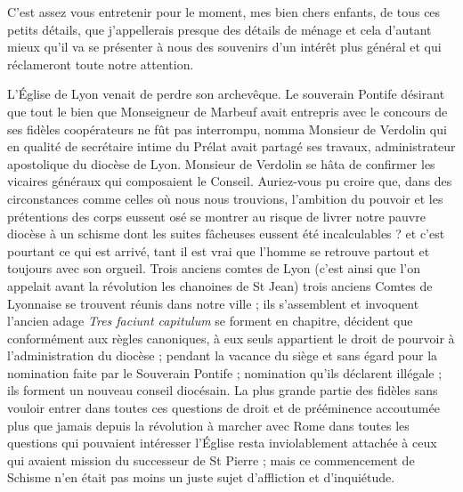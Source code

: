 \documentclass[11pt,a4paper]{report}
\begin{document}
C'est assez vous entretenir pour le moment, mes bien chers enfants, de tous ces petits détails, que j'appellerais presque des détails de ménage et cela d'autant mieux qu'il va se présenter à nous des souvenirs d'un intérêt plus général et qui réclameront toute notre attention.

L'Église de Lyon venait de perdre son archevêque. Le souverain Pontife désirant que tout le bien que Monseigneur de Marbeuf avait entrepris avec le concours de ses fidèles coopérateurs ne fût pas interrompu, nomma Monsieur de Verdolin qui en qualité de secrétaire intime du Prélat avait partagé ses travaux, administrateur apostolique du diocèse de Lyon. Monsieur de Verdolin se hâta de confirmer les vicaires généraux qui composaient le Conseil. Auriez-vous pu croire que, dans des circonstances comme celles où nous nous trouvions, l'ambition du pouvoir et les prétentions des corps eussent osé se montrer au risque de livrer notre pauvre diocèse à un schisme dont les suites fâcheuses eussent été incalculables ? et c'est pourtant ce qui est arrivé, tant il est vrai que l'homme se retrouve partout et toujours avec son orgueil. Trois anciens comtes de Lyon (c'est ainsi que l'on appelait avant la révolution les chanoines de St Jean) trois anciens Comtes de Lyonnaise se trouvent réunis dans notre ville ; ils s'assemblent et invoquent l'ancien adage \textit{Tres faciunt capitulum} se forment en chapitre, décident que conformément aux règles canoniques, à eux seuls appartient le droit de pourvoir à l'administration du diocèse ; pendant la vacance du siège et sans égard pour la nomination faite par le Souverain Pontife ; nomination qu'ils déclarent illégale ; ils forment un nouveau conseil diocésain. La plus grande partie des fidèles sans vouloir entrer dans toutes ces questions de droit et de prééminence accoutumée plus que jamais depuis la révolution à marcher avec Rome dans toutes les questions qui pouvaient intéresser l'Église resta inviolablement attachée à ceux qui avaient mission du successeur de St Pierre ; mais ce commencement de Schisme n'en était pas moins un juste sujet d'affliction et d'inquiétude.
\end{document}
